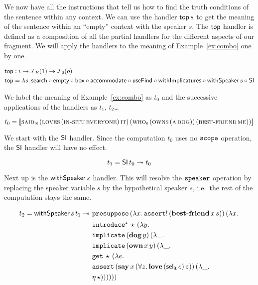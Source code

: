 We now have all the instructions that tell us how to find the truth
conditions of the sentence within any context. We can use the handler
$\textsf{top}\,s$ to get the meaning of the sentence within an ``empty''
context with the speaker $s$. The $\textsf{top}$ handler is defined as a
composition of all the partial handlers for the different aspects of our
fragment. We will apply the handlers to the meaning of
Example~\ref{ex:combo} one by one.

\begin{align*}
  \textsf{top} &: \iota \to \mathcal{F}_E(1) \to \mathcal{F}_\emptyset(o) \\
  \textsf{top} &= \lambda s.\, \textsf{search} \mathbin{\circ} \textsf{empty} \mathbin{\circ} \textsf{box} \mathbin{\circ} \textsf{accommodate} \mathbin{\circ} \textsf{useFind} \mathbin{\circ} \textsf{withImplicatures} \mathbin{\circ} \textsf{withSpeaker}\,s \mathbin{\circ} \textsf{SI}
\end{align*}

We label the meaning of Example~\ref{ex:combo} as $t_0$ and the successive
applications of the handlers as $t_1$, $t_2$\ldots

$$
t_0 = \llbracket \textsc{said}_{\textsc{is}}\,(\textsc{loves}\,(\textsc{in-situ}\,\textsc{everyone})\,\textsc{it})\,(\textsc{who}_{\textsc{s}}\,(\textsc{owns}\,(\textsc{a}\,\textsc{dog}))\,(\textsc{best-friend}\,\textsc{me})) \rrbracket
$$

We start with the $\textsf{SI}$ handler. Since the computation $t_0$ uses no
$\mathtt{scope}$ operation, the $\textsf{SI}$ handler will have no effect.

$$
t_1 = \textsf{SI}\,t_0 \twoheadrightarrow t_0
$$

Next up is the $\textsf{withSpeaker}\,s$ handler. This will resolve the
$\mathtt{speaker}$ operation by replacing the speaker variable $s$ by the
hypothetical speaker $s$, i.e.\ the rest of the computation stays the same.

\begin{align*}
  t_2 = \app{\withSpeaker}{s}{t_1} \tto \ 
  &\app{\op{presuppose}}{(\lam{x}{\ap{\op{assert}!}{(\app{\obj{best-friend}}{x}{s})}})}{(\lam{x}{ \\
  &\app{\op{introduce^i}}{\star}{(\lam{y}{ \\
  &\app{\op{implicate}}{(\ap{\obj{dog}}{y})}{(\lam{\_}{ \\
  &\app{\op{implicate}}{(\app{\obj{own}}{x}{y})}{(\lam{\_}{ \\
  &\app{\op{get}}{\star}{(\lam{e}{ \\
  &\app{\op{assert}}{(\app{\obj{say}}{x}{(\forall z.\, \app{\obj{love}}{(\ap{\selit}{e})}{z})})}{(\lam{\_}{ \\
  &\etaE{\star}})}})}})}})}})}})}
\end{align*}

